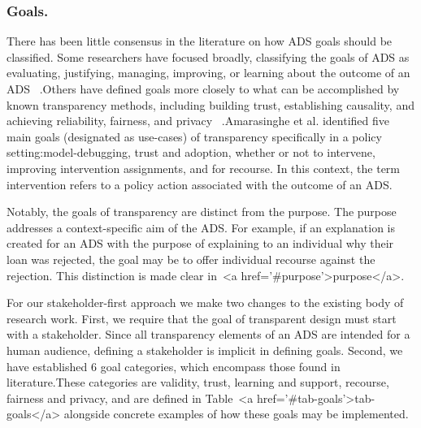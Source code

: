 \subsubsection{Goals.} There has been little consensus in the literature on how ADS goals should be classified. Some researchers have focused broadly, classifying the goals of ADS as evaluating, justifying, managing, improving, or learning about the outcome of an ADS ~\cite{meske}.Others have defined goals more closely to what can be accomplished by known transparency methods, including building trust, establishing causality, and achieving reliability, fairness, and privacy ~\cite{DBLP:journals/corr/abs-2012-01805}.Amarasinghe et al. identified five main goals (designated as use-cases) of transparency specifically in a policy setting:model-debugging, trust and adoption, whether or not to intervene, improving intervention assignments, and for recourse. In this context, the term intervention refers to a policy action associated with the outcome of an ADS.

Notably, the goals of transparency are distinct from the purpose. The purpose addresses a context-specific aim of the ADS. For example, if an explanation is created for an ADS with the purpose of explaining to an individual why their loan was rejected, the goal may be to offer individual recourse against the rejection. This distinction is made clear in~<a href='#purpose'>purpose</a>.

For our stakeholder-first approach we make two changes to the existing body of research work. First, we require that the goal of transparent design must start with a stakeholder. Since all transparency elements of an ADS are intended for a human audience, defining a stakeholder is implicit in defining goals. Second, we have established 6 goal categories, which encompass those found in literature.These categories are validity, trust, learning and support, recourse, fairness and privacy, and are defined in Table~<a href='#tab-goals'>tab-goals</a> alongside concrete examples of how these goals may be implemented.

